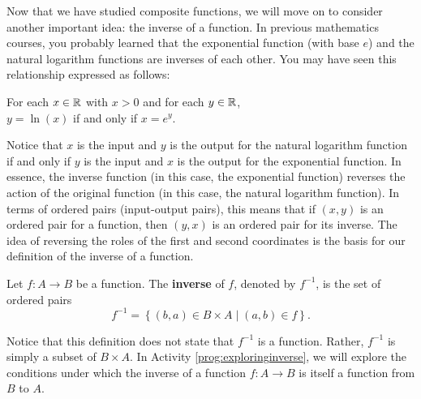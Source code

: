 Now that we have studied composite functions, we will move on to consider another important idea: the inverse of a function. In previous mathematics courses, you probably learned that the exponential function (with base $e$) and the natural logarithm functions are inverses of each other.  You may have seen this relationship expressed as follows:
\begin{center}
For each $x \in \mathbb{R}$ with $x > 0$ and for each $y \in \mathbb{R}$, \\
$y = \ln(x)$  if and only if  $x = e^y$.
\end{center}
Notice that $x$ is the input and $y$ is the output for the natural logarithm function if and only if $y$ is the input and $x$ is the output for the exponential function.  In essence, the inverse function (in this case, the exponential function) reverses the action of the original function (in this case, the natural logarithm function).  In terms of ordered pairs (input-output pairs), this means that if  $( {x, y} )$ is an ordered pair for a function, then  $( {y, x} )$ is an ordered pair for its inverse.  The idea of reversing the roles of the first and second coordinates is the basis for our definition of the inverse of a function.

\begin{definition}
Let  $f : A \to B$  be a function.  The \textbf{inverse} of
  $f$\!, denoted by  $f^{ - 1} $,
\label{sym:finverse} is the set of ordered pairs 
\[f^{ - 1}  = \left\{ { {( {b, a} ) \in B \times A} \mid ( {a, b} ) \in f} \right\}.\]
\end{definition}

Notice that this definition does not state that  $f^{-1} $  is a function.  Rather, $f^{-1}$ is simply a subset of  $B \times A$.  In Activity \ref{prog:exploringinverse}, we will explore the conditions under which the inverse of a function  $f: A \to B$ is itself a function from  $B$ to $A$.

